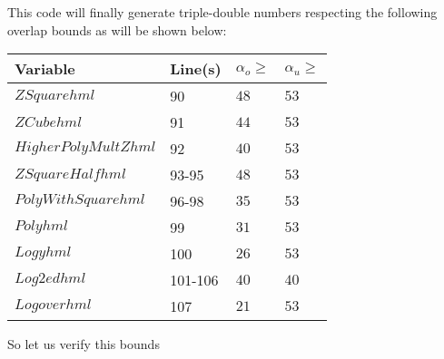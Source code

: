 This code will finally generate triple-double numbers respecting the following overlap bounds as will be
shown below:
\begin{center}
\begin{tabular}{|l|l|l|l|}
\hline
Variable & Line(s) & $\alpha_o \geq$ & $\alpha_u \geq$ \\
\hline
$ZSquarehml$ & 90 & $48$ & $53$ \\
\hline
$ZCubehml$ & 91 & $44$ & $53$ \\
\hline
$HigherPolyMultZhml$ & 92 & $40$ & $53$ \\
\hline 
$ZSquareHalfhml$ & 93-95 & $48$ & $53$ \\
\hline
$PolyWithSquarehml$ & 96-98 & $35$ & $53$ \\
\hline 
$Polyhml$ & 99 & $31$ & $53$ \\
\hline
$Logyhml$ & 100 & $26$ & $53$ \\
\hline
$Log2edhml$ & 101-106 & $40$ & $40$ \\
\hline
$Logoverhml$ & 107 & $21$ & $53$ \\
\hline
\end{tabular}
\end{center}
So let us verify this bounds 
